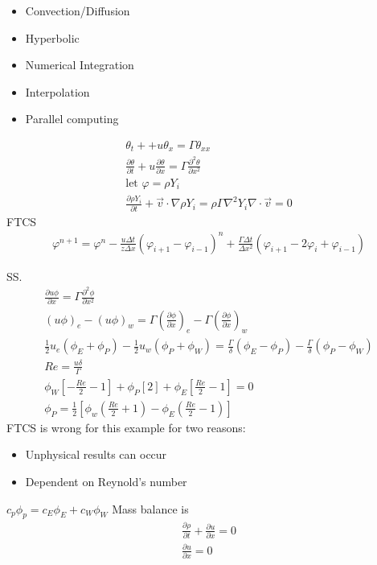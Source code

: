 \documentclass{article}
\begin{document}
\begin{itemize}
\item Convection/Diffusion
\item Hyperbolic
\item Numerical Integration
\item Interpolation
\item Parallel computing
\end{itemize}
\renewcommand{\d}[2]{\frac{\partial #1}{\partial #2}}
\newcommand{\dtwo}[2]{\frac{\partial^2 #1}{\partial #2^2}}
\begin{align}
  \theta_t + + u \theta_x = \Gamma \theta_{xx} \\
  \d{\theta}{t} + u \d{\theta}{x} = \Gamma\dtwo{\theta}{x} \\
  \text{let }\varphi = \rho Y_i \\
  \d{\rho Y_i}{t} + \vec{v}\cdot \nabla \rho Y_i = \rho \Gamma \nabla^2 Y_i
  \nabla \cdot \vec{v} = 0
\end{align}
FTCS
\begin{align}
  \varphi^{n+1} = \varphi^n - \frac{u\Delta t}{z\Delta x}\left(\varphi_{i+1}-\varphi_{i-1}\right)^n + \frac{\Gamma \Delta t}{\Delta x^2}\left(\varphi_{i+1}-2\varphi_{i}+\varphi_{i-1}\right)
  \label{FTCS}
\end{align}

SS.
\begin{align}
  \d{u\phi}{x} = \Gamma \dtwo{\phi}{x}\\
  (u\phi)_e - (u\phi)_w = \Gamma \left(\d{\phi}{x}\right)_e - \Gamma \left(\d{\phi}{x}\right)_w\\
  \frac{1}{2}u_e\left(\phi_E + \phi_P\right) - \frac{1}{2}u_w\left(\phi_P + \phi_W\right) = \frac{\Gamma}{\delta}\left(\phi_E - \phi_P\right) - \frac{\Gamma}{\delta}\left(\phi_P - \phi_W\right)\\
  Re = \frac{u\delta}{\Gamma}\\
  \phi_W\left[-\frac{Re}{2}-1\right]+\phi_P\left[2\right] + \phi_E\left[\frac{Re}{2}-1\right] = 0\\
  \phi_P = \frac{1}{2} \left[\phi_w\left(\frac{Re}{2} + 1\right) - \phi_E\left(\frac{Re}{2} - 1\right)\right]
  \label{Why FTCS is wrong for convective}
\end{align}
FTCS is wrong for this example for two reasons:
\begin{itemize}
  \item Unphysical results can occur
  \item Dependent on Reynold's number
\end{itemize}
$c_p \phi_p = c_E\phi_E + c_W\phi_W$
Mass balance is 
\begin{align}
\d{\rho}{t} + \d{u}{x} = 0\\
\d{u}{x} = 0
\end{align}
\end{document}
